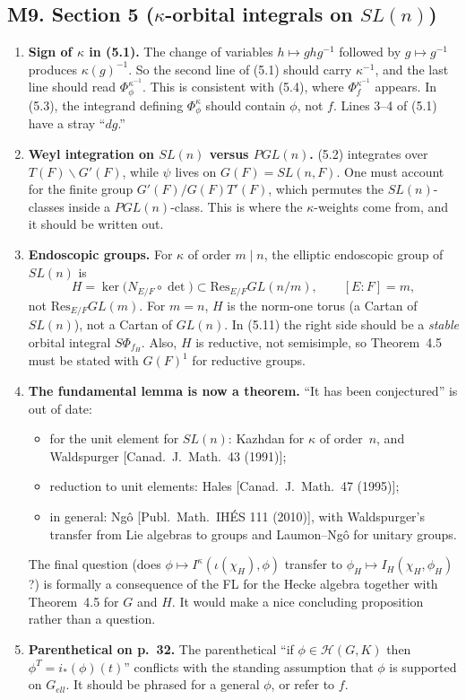 \documentclass[11pt]{article}
\begin{document}
\subsection*{M9. Section 5 ($\kappa$-orbital integrals on $SL(n)$)}
\begin{enumerate}[label=(\alph*)]
\item \textbf{Sign of $\kappa$ in (5.1).} The change of variables $h\mapsto ghg^{-1}$ followed by $g\mapsto g^{-1}$ produces $\kappa(g)^{-1}$. So the second line of (5.1) should carry $\kappa^{-1}$, and the last line should read $\Phi^{\kappa^{-1}}_\phi$. This is consistent with (5.4), where $\Phi^{\kappa^{-1}}_f$ appears. In (5.3), the integrand defining $\Phi^\kappa_\phi$ should contain $\phi$, not $f$. Lines 3--4 of (5.1) have a stray ``$dg$.''
\item \textbf{Weyl integration on $SL(n)$ versus $PGL(n)$.} (5.2) integrates over $T(F)\backslash G'(F)$, while $\psi$ lives on $G(F)=SL(n,F)$. One must account for the finite group $G'(F)/G(F)T'(F)$, which permutes the $SL(n)$-classes inside a $PGL(n)$-class. This is where the $\kappa$-weights come from, and it should be written out.
\item \textbf{Endoscopic groups.} For $\kappa$ of order $m\mid n$, the elliptic endoscopic group of $SL(n)$ is
\[H=\ker\big(N_{E/F}\circ\det\big)\subset \mathrm{Res}_{E/F}GL(n/m),\qquad [E:F]=m,\]
not $\mathrm{Res}_{E/F}GL(m)$. For $m=n$, $H$ is the norm-one torus (a Cartan of $SL(n)$), not a Cartan of $GL(n)$. In (5.11) the right side should be a \emph{stable} orbital integral $S\Phi_{f_H}$. Also, $H$ is reductive, not semisimple, so Theorem~4.5 must be stated with $G(F)^1$ for reductive groups.
\item \textbf{The fundamental lemma is now a theorem.} ``It has been conjectured'' is out of date:
\begin{itemize}
\item for the unit element for $SL(n)$: Kazhdan for $\kappa$ of order~$n$, and Waldspurger [Canad.\ J.\ Math.\ 43 (1991)];
\item reduction to unit elements: Hales [Canad.\ J.\ Math.\ 47 (1995)];
\item in general: Ng\^o [Publ.\ Math.\ IH\'ES 111 (2010)], with Waldspurger's transfer from Lie algebras to groups and Laumon--Ng\^o for unitary groups.
\end{itemize}
The final question (does $\phi\mapsto I^\kappa(\iota(\chi_H),\phi)$ transfer to $\phi_H\mapsto I_H(\chi_H,\phi_H)$?) is formally a consequence of the FL for the Hecke algebra together with Theorem~4.5 for $G$ and $H$. It would make a nice concluding proposition rather than a question.
\item \textbf{Parenthetical on p.~32.} The parenthetical ``if $\phi\in\mathcal H(G,K)$ then $\phi^T=i_*(\phi)(t)$'' conflicts with the standing assumption that $\phi$ is supported on $G_{ell}$. It should be phrased for a general $\phi$, or refer to $f$.
\end{enumerate}
\end{document}
